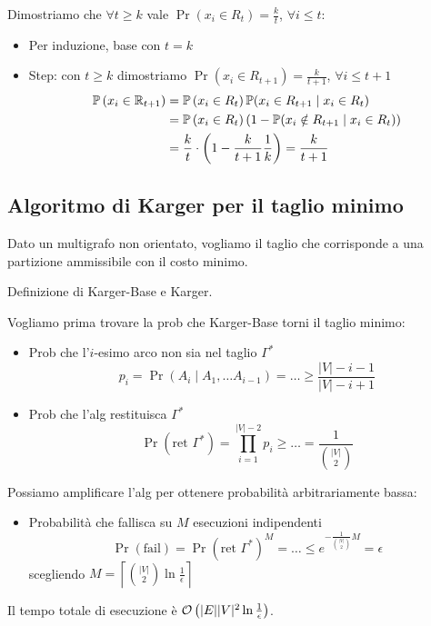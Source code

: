 Dimostriamo che $\forall t \geq k$ vale $\Pr\left(x_i \in R_t \right) = \frac{k}{t}$, $\forall i \leq t$:
\begin{itemize}
	\item Per induzione, base con $t = k$

	\item Step: con $t \geq k$ dimostriamo $\Pr \left(x_i \in R_{t+1}\right) = \frac{k}{t+1}$, $\forall i \leq t+1$
	\begin{align*}
		\mathbb{P} \left(x_i \in \mathbb{R}_{t+1}\right) & = \mathbb{P} \left(x_i \in R_t\right) \mathbb{P} (x_i \in R_{t+1} \mid x_i \in R_t ) \\
		& = \mathbb{P} \left(x_i \in R_t\right) \left( 1 - \mathbb{P} (x_i \notin R_{t+1} \mid x_i \in R_t) \right) \\
		& = \frac{k}{t} \cdot \left(1 - \frac{k}{t + 1} \frac{1}{k} \right) = \frac{k}{t+1}
	\end{align*}
\end{itemize}

\subsection{Algoritmo di Karger per il taglio minimo}

Dato un multigrafo non orientato, vogliamo il taglio che corrisponde a una partizione ammissibile con il costo minimo.

Definizione di Karger-Base e Karger.

Vogliamo prima trovare la prob che Karger-Base torni il taglio minimo:
\begin{itemize}
	\item Prob che l'$i$-esimo arco non sia nel taglio $\Gamma^\ast$
	$$ p_i = \Pr \left(A_i \mid A_1, \dots A_{i-1}\right) = \dots \geq \frac{|V| - i - 1}{|V| - i + 1} $$

	\item Prob che l'alg restituisca $\Gamma^\ast$
	$$ \Pr (\text{ret } \Gamma^\ast) = \prod_{i = 1}^{|V| - 2} p_i \geq \dots = \frac{1}{\binom{|V|}{2}} $$
\end{itemize}

Possiamo amplificare l'alg per ottenere probabilità arbitrariamente bassa:
\begin{itemize}
	\item Probabilità che fallisca su $M$ esecuzioni indipendenti
	$$ \Pr (\text{fail}) = \Pr (\text{ret } \Gamma^\ast)^M = \dots \leq e^{- \frac{1}{\binom{|V|}{2}} M} = \epsilon$$
	scegliendo $M = \left\lceil \binom{|V|}{2} \ln \frac{1}{\epsilon} \right\rceil$
\end{itemize}

Il tempo totale di esecuzione è $\mathcal{O} \left(|E| |V|^2 \ln \frac{1}{\epsilon}\right)$.